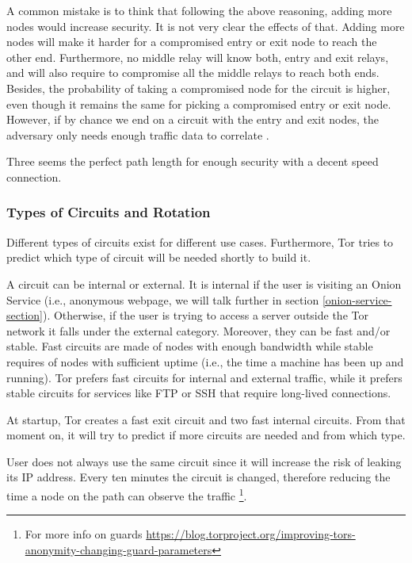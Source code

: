 \documentclass[11pt, a4paper,twoside]{tesi_upf}
\begin{document}
A common mistake is to think that following the above reasoning, adding more nodes would increase security.
It is not very clear the effects of that. Adding more nodes will make it harder for a compromised entry or exit node to reach the other end. Furthermore, no middle relay will know both, entry and exit relays, and will also require to compromise all the middle relays to reach both ends. Besides, the probability of taking a compromised node for the circuit is higher, even though it remains the same for picking a compromised entry or exit node. However, if by chance we end on a circuit with the entry and exit nodes, the adversary only needs enough traffic data to correlate \cite{master-tor-circuit}.

Three seems the perfect path length for enough security with a decent speed connection.

\subsubsection{Types of Circuits and Rotation}

Different types of circuits exist for different use cases. Furthermore, Tor tries to predict which type of circuit will be needed shortly to build it.

A circuit can be internal or external. It is internal if the user is visiting an Onion Service (i.e., anonymous webpage, we will talk further in section \ref{onion-service-section}). Otherwise, if the user is trying to access a server outside the Tor network it falls under the external category. Moreover, they can be fast and/or stable. Fast circuits are made of nodes with enough bandwidth while stable requires of nodes with sufficient uptime (i.e., the time a machine has been up and running). Tor prefers fast circuits for internal and external traffic, while it prefers stable circuits for services like FTP or SSH that require long-lived connections.

At startup, Tor creates a fast exit circuit and two fast internal circuits. From that moment on, it will try to predict if more circuits are needed and from which type.

User does not always use the same circuit since it will increase the risk of leaking its IP address. Every ten minutes the circuit is changed, therefore reducing the time a node on the path can observe the traffic \footnote{For more info on guards \url{https://blog.torproject.org/improving-tors-anonymity-changing-guard-parameters}}.
\end{document}
